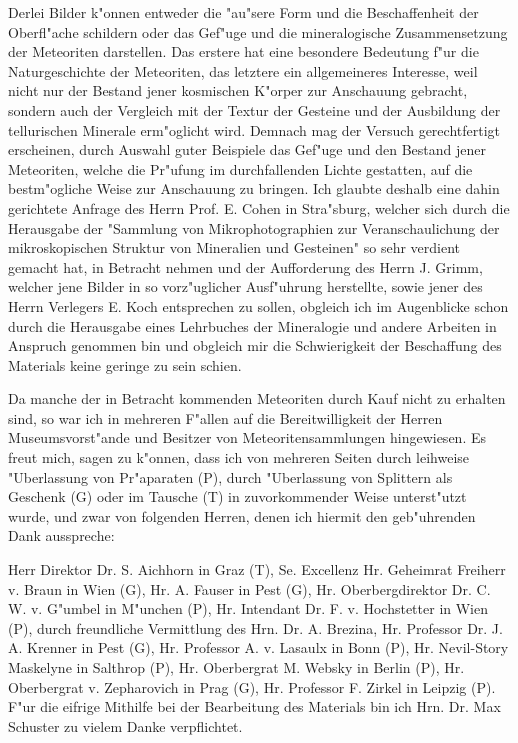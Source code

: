 \documentclass[a4paper, 11pt, oneside, polutonikogreek, german]{article}
\begin{document}
Derlei Bilder k"onnen entweder die "au"sere Form und die Beschaffenheit der Oberfl"ache schildern oder das Gef"uge und die mineralogische Zusammensetzung der Meteoriten darstellen. Das erstere hat eine besondere Bedeutung f"ur die Naturgeschichte der Meteoriten, das letztere ein allgemeineres Interesse, weil nicht nur der Bestand jener kosmischen K"orper zur Anschauung gebracht, sondern auch der Vergleich mit der Textur der Gesteine und der Ausbildung der tellurischen Minerale erm"oglicht wird. Demnach mag der Versuch gerechtfertigt erscheinen, durch Auswahl guter Beispiele das Gef"uge und den Bestand jener Meteoriten, welche die Pr"ufung im durchfallenden Lichte gestatten, auf die bestm"ogliche Weise zur Anschauung zu bringen. Ich glaubte deshalb eine dahin gerichtete Anfrage des Herrn Prof. E. Cohen in Stra"sburg, welcher sich durch die Herausgabe der "Sammlung von Mikrophotographien zur Veranschaulichung der mikroskopischen Struktur von Mineralien und Gesteinen" so sehr verdient gemacht hat, in Betracht nehmen und der Aufforderung des Herrn J. Grimm, welcher jene Bilder in so vorz"uglicher Ausf"uhrung herstellte, sowie jener des Herrn Verlegers E. Koch entsprechen zu sollen, obgleich ich im Augenblicke schon durch die Herausgabe eines Lehrbuches der Mineralogie und andere Arbeiten in Anspruch genommen bin und obgleich mir die Schwierigkeit der Beschaffung des Materials keine geringe zu sein schien.

Da manche der in Betracht kommenden Meteoriten durch Kauf nicht zu erhalten sind, so war ich in mehreren F"allen auf die Bereitwilligkeit der Herren Museumsvorst"ande und Besitzer von Meteoritensammlungen hingewiesen. Es freut mich, sagen zu k"onnen, dass ich von mehreren Seiten durch leihweise "Uberlassung von Pr"aparaten (P), durch "Uberlassung von Splittern als Geschenk (G) oder im Tausche (T) in zuvorkommender Weise unterst"utzt wurde, und zwar von folgenden Herren, denen ich hiermit den geb"uhrenden Dank ausspreche:

Herr Direktor Dr. S. Aichhorn in Graz (T), Se. Excellenz Hr. Geheimrat Freiherr v. Braun in Wien (G), Hr. A. Fauser in Pest (G), Hr. Oberbergdirektor Dr. C. W. v. G"umbel in M"unchen (P), Hr. Intendant Dr. F. v. Hochstetter in Wien (P), durch freundliche Vermittlung des Hrn. Dr. A. Brezina, Hr. Professor Dr. J. A. Krenner in Pest (G), Hr. Professor A. v. Lasaulx in Bonn (P), Hr. Nevil-Story Maskelyne in Salthrop (P), Hr. Oberbergrat M. Websky in Berlin (P), Hr. Oberbergrat v. Zepharovich in Prag (G), Hr. Professor F. Zirkel in Leipzig (P). F"ur die eifrige Mithilfe bei der Bearbeitung des Materials bin ich Hrn. Dr. Max Schuster zu vielem Danke verpflichtet.
\end{document}

